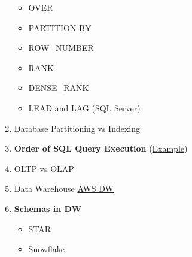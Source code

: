 \documentclass[11pt]{article}
\begin{document}
\begin{enumerate}
\begin{itemize}
	\item OVER
	\item PARTITION BY
	\item ROW\_NUMBER
	\item RANK
	\item DENSE\_RANK
	\item LEAD and LAG (SQL Server)
\end{itemize}
\item Database Partitioning vs Indexing
\item \textbf{Order of SQL Query Execution} (\href{https://sqlbolt.com/lesson/select_queries_order_of_execution}{Example})
\item OLTP vs OLAP
\item Data Warehouse \href{https://aws.amazon.com/data-warehouse/}{AWS DW}
\item \textbf{Schemas in DW}
\begin{itemize}
	\item STAR
	\item Snowflake
\end{itemize}
\end{enumerate}
\end{document}

